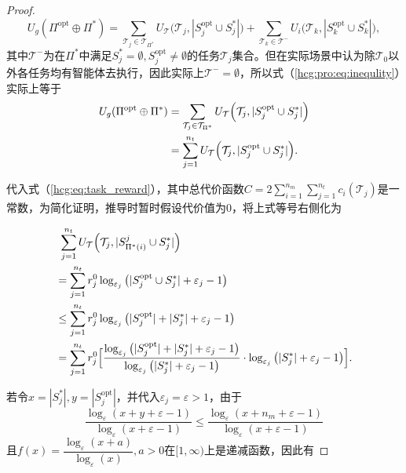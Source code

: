 \begin{proposition}
\begin{proof}
		\begin{equation}
		\label{hcg:pro:eq:inequlity}
			U_g(\Pi^{\text{opt}} \oplus \Pi^*) = \sum_{\mathcal{T}_j \in \mathcal{T}_{\Pi^*}} U_{\mathcal{T}} \Big(\mathcal{T}_j, |S_j^{\text{opt}} \cup S_j^*|\Big) + \sum_{\mathcal{T}_k \in \mathcal{T}^-} U_i\Big(\mathcal{T}_k, |S_k^{\text{opt}} \cup S_k^*|\Big),
		\end{equation}
		其中$\mathcal{T}^-$为在$\Pi^*$中满足$S_j^* = \emptyset, S_j^{\text{opt}} \neq \emptyset$的任务$\mathcal{T}_j$集合。但在实际场景中认为除$\mathcal{T}_0$以外各任务均有智能体去执行，因此实际上$\mathcal{T}^- = \emptyset$，所以式（\ref{hcg:pro:eq:inequlity}）实际上等于
		\begin{align}
			U_g(\Pi^{\text{opt}} \oplus \Pi^*) &= \sum_{\mathcal{T}_j \in \mathcal{T}_{\Pi^*}} U_{\mathcal{T}} \Big(\mathcal{T}_j, |S_j^{\text{opt}} \cup S_j^*|\Big)\notag\\
			&= \sum_{j=1}^{n_t} U_{\mathcal{T}} \Big(\mathcal{T}_j, |S_j^{\text{opt}} \cup S_j^*|\Big).
		\end{align}
			
		 代入式（\ref{hcg:eq:task_reward}），其中总代价函数$C=2\sum_{i=1}^{n_m} \sum_{j=1}^{n_t} c_i(\mathcal{T}_j)$是一常数，为简化证明，推导时暂时假设代价值为0，将上式等号右侧化为
		
		\begin{align}
			&\ \sum_{j=1}^{n_t} U_{\mathcal{T}}\Big(\mathcal{T}_j,|S_{\Pi^*(i)}^j \cup S_j^*|\Big)\notag\\
			&= \sum_{j=1}^{n_t} r_j^0 \log_{\varepsilon_j} \big(|S_j^{\text{opt}} \cup S_j^*| + \varepsilon_j - 1\big)\notag\\
			&\leq \sum_{j=1}^{n_t} r_j^0 \log_{\varepsilon_j} \big(|S_j^{\text{opt}}| + |S_j^*| + \varepsilon_j - 1\big)\notag\\
			\label{hcg:pro:eq:expand}&= \sum_{j=1}^{n_t} r_j^0 \Big[ \frac{\log_{\varepsilon_j} \big(|S_j^{\text{opt}}| + |S_j^*| + \varepsilon_j - 1\big)}{\log_{\varepsilon_j}\big(|S_j^*|+ \varepsilon_j - 1\big)} \cdot \log_{\varepsilon_j}\big(|S_j^*|+ \varepsilon_j - 1\big)\Big].
		\end{align}
		
		若令$x=|S_j^*|,y=|S_j^{\text{opt}}|$，并代入$\varepsilon_j = \varepsilon>1$，由于
		\begin{equation}
			\frac{\log_{\varepsilon}(x+y+\varepsilon-1)}{\log_{\varepsilon}(x+\varepsilon-1)} \leq \frac{\log_{\varepsilon}(x+n_m+\varepsilon-1)}{\log_{\varepsilon}(x+\varepsilon-1)}
		\end{equation}
		且$f(x)=\dfrac{\log_{\varepsilon}(x+a)}{\log_{\varepsilon}(x)},a>0$在$[1,\infty)$上是递减函数，因此有
		

\end{proof}
\end{proposition}
